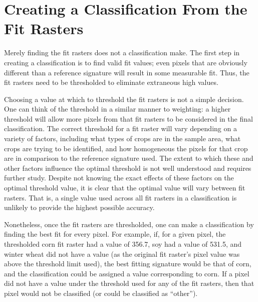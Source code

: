 \section{Creating a Classification From the Fit Rasters}
\label{appendix:tools:classify}

Merely finding the fit rasters does not a classification make. The first step in creating a classification is to find valid fit values; even pixels that are obviously different than a reference signature will result in some measurable fit. Thus, the fit rasters need to be thresholded to eliminate extraneous high values.

Choosing a value at which to threshold the fit rasters is not a simple decision. One can think of the threshold in a similar manner to weighting:  a higher threshold will allow more pixels from that fit rasters to be considered in the final classification. The correct threshold for a fit raster will vary depending on a variety of factors, including what types of crops are in the sample area, what crops are trying to be identified, and how homogeneous the pixels for that crop are in comparison to the reference signature used. The extent to which these and other factors influence the optimal threshold is not well understood and requires further study. Despite not knowing the exact effects of these factors on the optimal threshold value, it is clear that the optimal value will vary between fit rasters. That is, a single value used across all fit rasters in a classification is unlikely to provide the highest possible accuracy.

Nonetheless, once the fit rasters are thresholded, one can make a classification by finding the best fit for every pixel. For example, if, for a given pixel, the thresholded corn fit raster had a value of 356.7, soy had a value of 531.5, and winter wheat did not have a value (as the original fit raster’s pixel value was above the threshold limit used), the best fitting signature would be that of corn, and the classification could be assigned a value corresponding to corn. If a pixel did not have a value under the threshold used for any of the fit rasters, then that pixel would not be classified (or could be classified as “other”).

